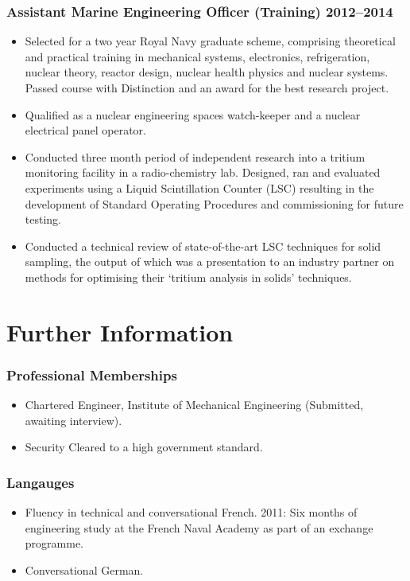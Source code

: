 \documentclass[a4paper, oneside, final, 11pt]{scrartcl} %
\begin{document}
\subsubsection*{Assistant Marine Engineering Officer (Training) \hfill 2012--2014}  
\normalfont
\begin{itemize}
	\item Selected for a two year Royal Navy graduate scheme, comprising theoretical and practical training in mechanical systems, electronics, refrigeration, nuclear theory, reactor design, nuclear health physics and nuclear systems. Passed course with Distinction and an award for the best research project. 
	\item Qualified as a nuclear engineering spaces watch-keeper and a nuclear electrical panel operator. 
	\item Conducted  three month period of independent research into a tritium monitoring facility in a radio-chemistry lab. Designed, ran and evaluated experiments using a Liquid Scintillation Counter (LSC) resulting in the development of Standard Operating Procedures and commissioning for future testing. 
	\item Conducted a technical review of state-of-the-art LSC techniques for solid sampling, the output of which was a presentation to an industry partner on methods for optimising their `tritium analysis in solids' techniques.
\end{itemize}




\section{Further Information}
\subsubsection*{Professional Memberships}

\begin{itemize}	
\item Chartered Engineer, Institute of Mechanical Engineering (Submitted, awaiting interview).
\item Security Cleared to a high government standard.
\end{itemize}


\subsubsection*{Langauges}
\begin{itemize}	
\item Fluency in technical and conversational French. 2011: Six months of engineering study at the French Naval Academy as part of an exchange programme. 
\item Conversational German. 
\end{itemize}
\end{document}
